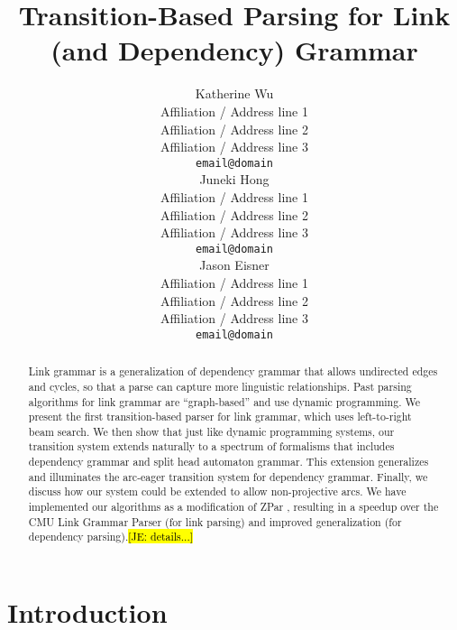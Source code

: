 \documentclass[11pt]{article}
\title{Transition-Based Parsing for Link (and Dependency) Grammar}
\author{Katherine Wu \\
  Affiliation / Address line 1 \\
  Affiliation / Address line 2 \\
  Affiliation / Address line 3 \\
  {\tt email@domain} \\\And
  Juneki Hong \\
  Affiliation / Address line 1 \\
  Affiliation / Address line 2 \\
  Affiliation / Address line 3 \\
  {\tt email@domain} \\\And
  Jason Eisner \\
  Affiliation / Address line 1 \\
  Affiliation / Address line 2 \\
  Affiliation / Address line 3 \\
  {\tt email@domain} \\
  }
\date{}
\newcommand{\Note}[1]{}
\renewcommand{\Note}[1]{\hl{[#1]}}  %
\newcommand{\NoteSigned}[3]{{\sethlcolor{#2}\Note{#1: #3}}}
\newcommand{\NoteJE}[1]{\NoteSigned{JE}{LightBlue}{#1}}
\begin{document}
\maketitle
\begin{abstract}
  Link grammar \cite{!!!} is a generalization of dependency grammar
  that allows undirected edges and cycles, so that a parse can capture
  more linguistic relationships.  Past parsing algorithms for link
  grammar are ``graph-based'' and use dynamic programming.  We present
  the first transition-based parser for link grammar, which uses
  left-to-right beam search.  We then show that just like dynamic
  programming systems, our transition system extends naturally to a
  spectrum of formalisms that includes dependency grammar and split
  head automaton grammar.  This extension generalizes and illuminates
  the arc-eager transition system for dependency grammar.  Finally, we
  discuss how our system could be extended to allow non-projective
  arcs.  We have implemented our algorithms as a modification of ZPar
  \cite{!!!}, resulting in a speedup over the CMU Link Grammar Parser
  (for link parsing) and improved generalization (for dependency
  parsing).\NoteJE{details...}
\end{abstract}

\section{Introduction}
\end{document}
